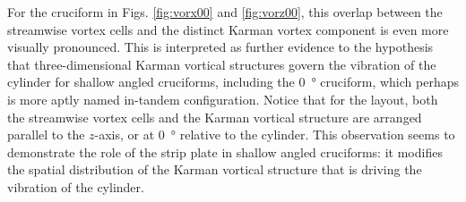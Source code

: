 \documentclass[oneside]{utmthesis}
\begin{document}
For the \angon{} cruciform in Figs. \ref{fig:vorx00} and \ref{fig:vorz00}, this overlap between the streamwise vortex cells and the distinct Karman vortex component is even more visually pronounced. This is interpreted as further evidence to the hypothesis that three-dimensional Karman vortical structures govern the vibration of the cylinder for shallow angled cruciforms, including the \SI{0}{\degree} cruciform, which perhaps is more aptly named in-tandem configuration. Notice that for the \angon{} layout, both the streamwise vortex cells and the Karman vortical structure are arranged parallel to the $z$-axis, or at \SI{0}{\degree} relative to the cylinder. This observation seems to demonstrate the role of the strip plate in shallow angled cruciforms: it modifies the spatial distribution of the Karman vortical structure that is driving the vibration of the cylinder.
\end{document}
